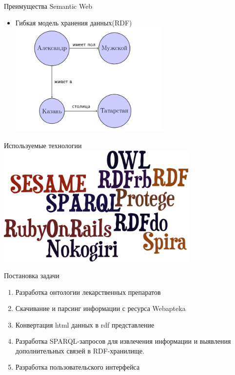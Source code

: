 \documentclass{beamer}
\begin{document}
\begin{frame}{Преимущества Semantic Web}
 \begin{itemize}
   \item Гибкая модель хранения данных(RDF)
   \includegraphics[width=80mm]{rdf.png}
 \end{itemize}

\end{frame}
\begin{frame}[t,fragile]{Используемые технологии}
\includegraphics[width=100mm]{words.png}
\end{frame}
\begin{frame}{Постановка задачи}
 \begin{enumerate}
  \item Разработка онтологии лекарственных препаратов
  \item Скачивание и парсинг информации с ресурса Webapteka
  \item Конвертация html данных в rdf представление
  \item Разработка SPARQL-запросов для извлечения информации и выяв­ления дополнительных связей в RDF-хранилище.
  \item Разработка пользовательского интерфейса
\end{enumerate}
\end{frame}
\end{document}
